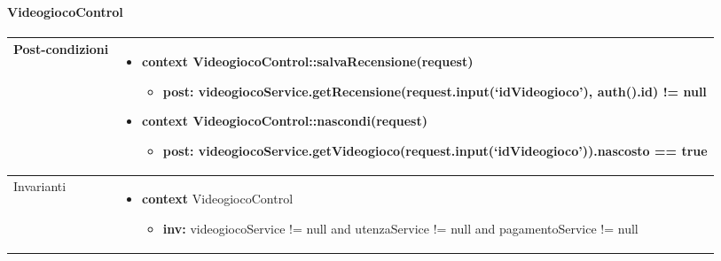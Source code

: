 \paragraph{VideogiocoControl}
\small\begin{tabular}{|| l | p{28em} ||} 
\hline
Post-condizioni & \begin{itemize}[leftmargin=*]
	\item \textbf{context} VideogiocoControl::salvaRecensione(request)
	\begin{itemize}
		\item[ ] \textbf{post:} videogiocoService.getRecensione(request.input(‘idVideogioco’), auth().id) != null
	\end{itemize}

	\item \textbf{context} VideogiocoControl::nascondi(request)
	\begin{itemize}
		\item[ ] \textbf{post:} videogiocoService.getVideogioco(request.input(‘idVideogioco’)).nascosto == true
	\end{itemize}
\end{itemize}\\
\hline
Invarianti & \begin{itemize}
	\item \textbf{context} VideogiocoControl
	\begin{itemize}
		\item[ ] \textbf{inv:} videogiocoService != null and utenzaService != null and pagamentoService != null
	\end{itemize}
\end{itemize}\\
\hline
\end{tabular}

\newpage
